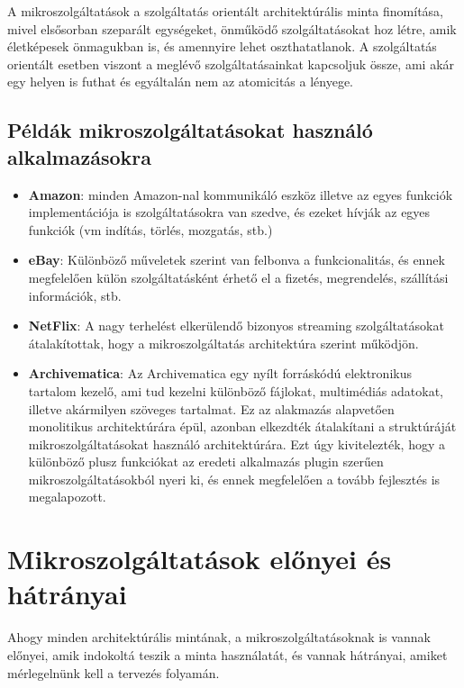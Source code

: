 \documentclass[11pt,magyar,a4paper,twoside,]{report}
\begin{document}
A mikroszolgáltatások a szolgáltatás orientált architektúrális minta
finomítása, mivel elsősorban szeparált egységeket, önműködő
szolgáltatásokat hoz létre, amik életképesek önmagukban is, és amennyire
lehet oszthatatlanok. A szolgáltatás orientált esetben viszont a meglévő
szolgáltatásainkat kapcsoljuk össze, ami akár egy helyen is futhat és
egyáltalán nem az atomicitás a lényege.

\subsection{Példák mikroszolgáltatásokat használó
alkalmazásokra}\label{puxe9lduxe1k-mikroszolguxe1ltatuxe1sokat-hasznuxe1luxf3-alkalmazuxe1sokra}

\begin{itemize}
\item
  \textbf{Amazon}: minden Amazon-nal kommunikáló eszköz illetve az egyes
  funkciók implementációja is szolgáltatásokra van szedve, és ezeket
  hívják az egyes funkciók (vm indítás, törlés, mozgatás, stb.)
\item
  \textbf{eBay}: Különböző műveletek szerint van felbonva a
  funkcionalitás, és ennek megfelelően külön szolgáltatásként érhető el
  a fizetés, megrendelés, szállítási információk, stb.
\item
  \textbf{NetFlix}: A nagy terhelést elkerülendő bizonyos streaming
  szolgáltatásokat átalakítottak, hogy a mikroszolgáltatás architektúra
  szerint működjön.
\item
  \textbf{Archivematica}: Az Archivematica\citep{archivematica} egy
  nyílt forráskódú elektronikus tartalom kezelő, ami tud kezelni
  különböző fájlokat, multimédiás adatokat, illetve akármilyen szöveges
  tartalmat. Ez az alakmazás alapvetően monolitikus architektúrára épül,
  azonban elkezdték átalakítani a struktúráját mikroszolgáltatásokat
  használó architektúrára. Ezt úgy kivitelezték, hogy a különböző plusz
  funkciókat az eredeti alkalmazás plugin szerűen mikroszolgáltatásokból
  nyeri ki, és ennek megfelelően a tovább fejlesztés is
  megalapozott\citep{archivematica-wiki}.
\end{itemize}

\section{Mikroszolgáltatások előnyei és
hátrányai}\label{mikroszolguxe1ltatuxe1sok-elux151nyei-uxe9s-huxe1truxe1nyai}

Ahogy minden architektúrális mintának, a mikroszolgáltatásoknak is
vannak előnyei\citep{microservices}, amik indokoltá teszik a minta
használatát, és vannak hátrányai\citep{micro-disadv}, amiket
mérlegelnünk kell a tervezés folyamán.
\end{document}
